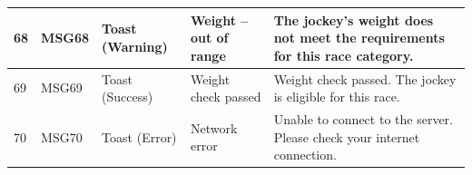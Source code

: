 \begin{longtable}{|p{}|p{}|p{}|p{}|p{}|}
68 & MSG68 & Toast (Warning) & Weight -- out of range & The jockey's weight does not meet the requirements for this race category. \\
\hline
69 & MSG69 & Toast (Success) & Weight check passed & Weight check passed. The jockey is eligible for this race. \\
\hline

70 & MSG70 & Toast (Error) & Network error & Unable to connect to the server. Please check your internet connection. \\
\hline

\end{longtable}



